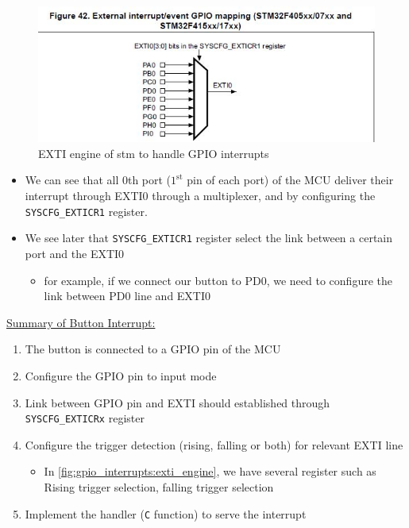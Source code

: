 \begin{figure}[h]
\centering
\includegraphics[scale=0.9,frame]{Figures/gpio_interrupts/exti_gpio}
\caption{EXTI engine of stm to handle GPIO interrupts}
\label{fig:gpio_interrupts:exti_gpio}
\end{figure}

    \begin{itemize}
    
    \item We can see that all 0th port ($\mathrm{1}^\mathrm{st}$ pin of each port) of the MCU deliver their interrupt through EXTI0 through a multiplexer, and by configuring  the \verb|SYSCFG_EXTICR1| register.

    \item  We see later that \verb|SYSCFG_EXTICR1| register select the link between a certain port and the EXTI0

        \begin{itemize}
            \item for example, if we connect our button to PD0, we need to configure the link between PD0 line and EXTI0
        \end{itemize}
    
    \end{itemize}

\underline{Summary of Button Interrupt:}

\begin{enumerate}

\item The button is connected to a GPIO pin of the MCU

\item  Configure the GPIO pin to input mode

\item  Link between GPIO pin and EXTI should established through \verb|SYSCFG_EXTICRx| register

\item  Configure the trigger detection (rising, falling or both) for relevant EXTI line

    \begin{itemize}
        \item In \autoref{fig:gpio_interrupts:exti_engine}, we have several register such as Rising trigger selection, falling trigger selection
    \end{itemize}

\item Implement the handler (\verb|C| function) to serve the interrupt

\end{enumerate}

